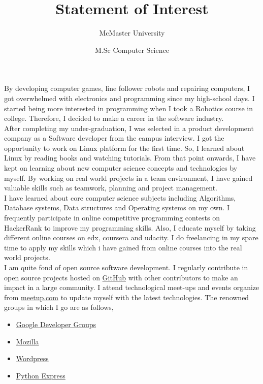 \documentclass{article}
\title{Statement of Interest}
\author{McMaster University}\date{M.Sc Computer Science}
\begin{document}
  \maketitle %

By developing computer games, line follower robots and repairing computers, I got overwhelmed with electronics and programming since my high-school days. I started being more interested in programming when I took a Robotics course in college. Therefore, I decided to make a career in the software industry.\\

After completing my under-graduation, I was selected in a product development company as a Software developer from the campus interview. I got the opportunity to work on Linux platform for the first time. So, I learned about Linux by reading books and watching tutorials. From that point onwards, I have kept on learning about new computer science concepts and technologies by myself. By working on real world projects in a team environment, I have gained valuable skills such as teamwork, planning and project management.\\

I have learned about core computer science subjects including Algorithms, Database systems, Data structures and Operating systems on my own. I frequently participate in online competitive programming contests on HackerRank to improve my programming skills. Also, I educate myself by taking different online courses on edx, coursera and udacity. I do freelancing in my spare time to apply my skills which i have gained from online courses into the real world projects.\\

I am quite fond of open source software development. I regularly contribute in open source projects hosted on \href{http://www.GitHub.com/mehul-m-prajapati}{GitHub} with other contributors to make an impact in a large community. I attend technological meet-ups and events organize from \href{www.meetup.com}{meetup.com} to update myself with the latest technologies. The renowned groups in which I go are as follows,

\begin{itemize}
   \item \href{https://developers.google.com/groups/chapter/106261089114347152720/}{Google Developer Groups}
   
   \item \href{http://mozillaindia.org/}{Mozilla} 
   
   \item \href{https://www.meetup.com/ahmedabad-wp-meetup/members/72560962/}{Wordpress}
   
   \item \href{https://pythonexpress.in/}{Python Express}
\end{itemize}
\end{document}
